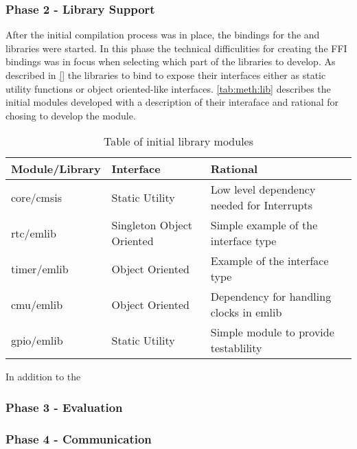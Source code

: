 \subsubsection{Phase 2 - Library Support}

After the initial compilation process was in place, the bindings for the  and {\emlib} libraries were started.
In this phase the technical difficulities for creating the FFI bindings was in focus when selecting which part of the libraries to develop.
As described in \autoref{}  the libraries to bind to expose their interfaces either as static utility functions or object oriented-like interfaces.
\autoref{tab:meth:lib} describes the initial modules developed with a description of their interaface and rational for chosing to develop the module.

\begin{table}[H]
  \begin{center}
    \begin{tabular}{|l|l|l|}
      \hline
      Module/Library & Interface & Rational \\
      \hline
      \hline
      core/cmsis & Static Utility & Low level dependency needed for Interrupts \\
      rtc/emlib & Singleton Object Oriented & Simple example of the interface type \\
      timer/emlib & Object Oriented & Example of the interface type \\
      cmu/emlib & Object Oriented & Dependency for handling clocks in emlib \\
      gpio/emlib & Static Utility & Simple module to provide testablility \\
    \end{tabular}
  \end{center}
  \caption{Table of initial library modules}
  \label{tab:meth:lib}
\end{table}

In addition to the

\subsubsection{Phase 3 - Evaluation}

\subsubsection{Phase 4 - Communication}

